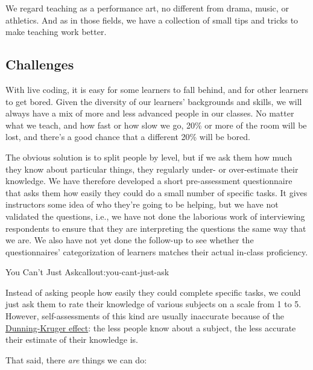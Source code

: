 
We regard teaching as a performance art, no different from drama, music,
or athletics. And as in those fields, we have a collection of small tips
and tricks to make teaching work better.

\subsection{Challenges}\label{challenges}

With live coding, it is easy for some learners to fall behind, and for
other learners to get bored. Given the diversity of our learners'
backgrounds and skills, we will always have a mix of more and less
advanced people in our classes. No matter what we teach, and how fast or
how slow we go, 20\% or more of the room will be lost, and there's a
good chance that a different 20\% will be bored.

The obvious solution is to split people by level, but if we ask them how
much they know about particular things, they regularly under- or
over-estimate their knowledge. We have therefore developed a short
pre-assessment questionnaire that asks them how easily they could do a
small number of specific tasks. It gives instructors some idea of who
they're going to be helping, but we have not validated the questions,
i.e., we have not done the laborious work of interviewing respondents to
ensure that they are interpreting the questions the same way that we
are. We also have not yet done the follow-up to see whether the
questionnaires' categorization of learners matches their actual in-class
proficiency.

\begin{callout}{You Can't Just Ask}{callout:you-cant-just-ask}

Instead of asking people how easily they could complete specific tasks,
we could just ask them to rate their knowledge of various subjects on a
scale from 1 to 5. However, self-assessments of this kind are usually
inaccurate because of the
\href{https://en.wikipedia.org/wiki/Dunning\%E2\%80\%93Kruger\_effect}{Dunning-Kruger
effect}: the less people know about a subject, the less accurate their
estimate of their knowledge is.
\end{callout}

That said, there \emph{are} things we can do:

